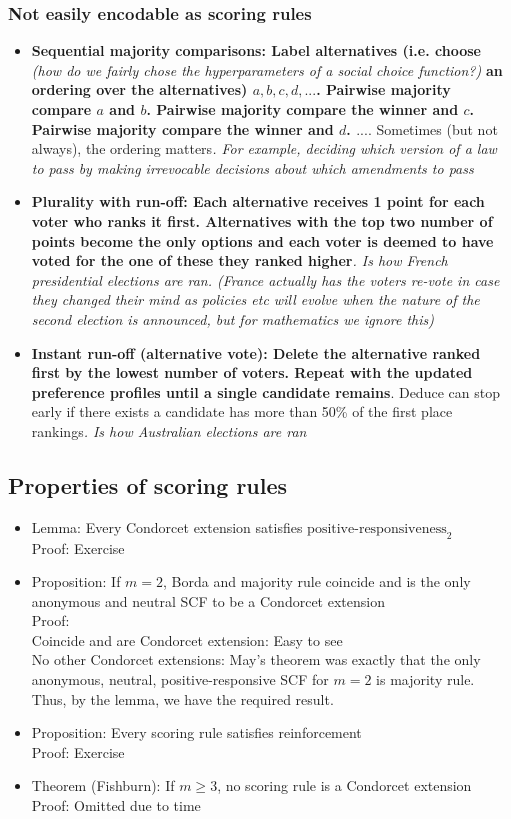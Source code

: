 \documentclass[20pt,a4paper,landscape]{extarticle}
\begin{document}
\begin{flushleft}
\subsubsection{Not easily encodable as scoring rules}
\begin{itemize}
\item \textbf{Sequential majority comparisons: Label alternatives (i.e. choose} \textit{(how do we fairly chose the hyperparameters of a social choice function?)} \textbf{an ordering over the alternatives) $a, b, c, d, ...$. Pairwise majority compare $a$ and $b$. Pairwise majority compare the winner and $c$. Pairwise majority compare the winner and $d$. $...$}. Sometimes (but not always), the ordering matters\textit{. For example, deciding which version of a law to pass by making irrevocable decisions about which amendments to pass}
\item \textbf{Plurality with run-off: Each alternative receives 1 point for each voter who ranks it first. Alternatives with the top two number of points become the only options and each voter is deemed to have voted for the one of these they ranked higher}\textit{. Is how French presidential elections are ran. (France actually has the voters re-vote in case they changed their mind as policies etc will evolve when the nature of the second election is announced, but for mathematics we ignore this)}
\item \textbf{Instant run-off (alternative vote): Delete the alternative ranked first by the lowest number of voters. Repeat with the updated preference profiles until a single candidate remains}. Deduce can stop early if there exists a candidate has more than 50\% of the first place rankings\textit{. Is how Australian elections are ran}
\end{itemize}
\subsection{Properties of scoring rules}
\begin{itemize}
\item Lemma: Every Condorcet extension satisfies $\textrm{positive-responsiveness}_2$\\
Proof: Exercise
\item Proposition: If $m = 2$, Borda and majority rule coincide and is the only anonymous and neutral SCF to be a Condorcet extension\\
Proof:\\
Coincide and are Condorcet extension: Easy to see\\
No other Condorcet extensions: May's theorem was exactly that the only anonymous, neutral, positive-responsive SCF for $m=2$ is majority rule. Thus, by the lemma, we have the required result.
\item Proposition: Every scoring rule satisfies reinforcement\\
Proof: Exercise
\item Theorem (Fishburn): If $m \geq 3$, no scoring rule is a Condorcet extension\\
Proof: Omitted due to time
\end{itemize}
\clearpage

\end{flushleft}
\end{document}
